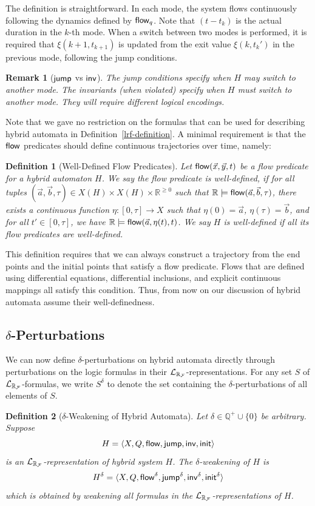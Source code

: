\documentclass[journal]{IEEEtran}
\newtheorem{definition}{Definition}
\newtheorem{remark}{Remark}
\begin{document}
The definition is straightforward. In each mode, the system flows continuously following the dynamics defined by $\mathsf{flow}_q$. Note that $(t-t_k)$ is the actual duration in the $k$-th mode. When a switch between two modes is performed, it is required that $\xi(k+1, t_{k+1})$ is updated from the exit value $\xi(k, t_k')$ in the previous mode, following the jump conditions.
\begin{remark}[$\mathsf{jump}$ vs $\mathsf{inv}$] The jump conditions specify when $H$ {\em may}  switch to another mode. The invariants (when violated) specify when $H$ {\em must} switch to another mode. They will require different logical encodings.
\end{remark}
Note that we gave no restriction on the formulas that can be used for describing hybrid automata in Definition~\ref{lrf-definition}. A minimal requirement is that the $\mathsf{flow}$ predicates should define continuous trajectories over time, namely:
\begin{definition}[Well-Defined Flow Predicates]
Let $\mathsf{flow}(\vec x, \vec y, t)$ be a flow predicate for a hybrid automaton $H$. We say the flow predicate is {\em well-defined}, if for all tuples $(\vec a,\vec b, \tau)\in X(H)\times X(H)\times \mathbb{R}^{\geq 0}$ such that $\mathbb{R}\models\mathsf{flow}(\vec a,\vec b, \tau)$, there exists a continuous function $\eta:[0,\tau]\rightarrow X$ such that $\eta(0) = \vec a$, $\eta(\tau) = \vec b$, and for all $t'\in [0,\tau]$, we have $\mathbb{R}\models\mathsf{flow}(\vec a, \eta(t), t)$. We say $H$ is {\em well-defined} if all its flow predicates are well-defined.
\end{definition}
This definition requires that we can always construct a trajectory from the end points and the initial points that satisfy a flow predicate. Flows that are defined using differential equations, differential inclusions, and explicit continuous mappings all satisfy this condition. Thus, from now on our discussion of hybrid automata assume their well-definedness.
\subsection{$\delta$-Perturbations}
We can now define $\delta$-perturbations on hybrid automata directly through perturbations on the logic formulas in their $\mathcal{L}_{\mathbb{R}_{\mathcal{F}}}$-representations. For any set $S$ of $\mathcal{L}_{\mathbb{R}_{\mathcal{F}}}$-formulas, we write $S^{\delta}$ to denote the set containing the $\delta$-perturbations of all elements of $S$.
\begin{definition}[$\delta$-Weakening of Hybrid Automata] Let $\delta\in\mathbb{Q}^+\cup\{0\}$ be arbitrary. Suppose
$$H = \langle X, Q, \mathsf{flow}, \mathsf{jump}, \mathsf{inv}, \mathsf{init}\rangle$$
is an $\mathcal{L}_{\mathbb{R}_{\mathcal{F}}}$-representation of hybrid system $H$. The {\em $\delta$-weakening} of $H$ is
$$H^{\delta} = \langle X, Q, \mathsf{flow}^{\delta}, \mathsf{jump}^{\delta}, \mathsf{inv}^{\delta}, \mathsf{init}^{\delta}\rangle$$
which is obtained by weakening all formulas in the $\mathcal{L}_{\mathbb{R}_{\mathcal{F}}}$-representations of $H$.
\end{definition}
\end{document}
